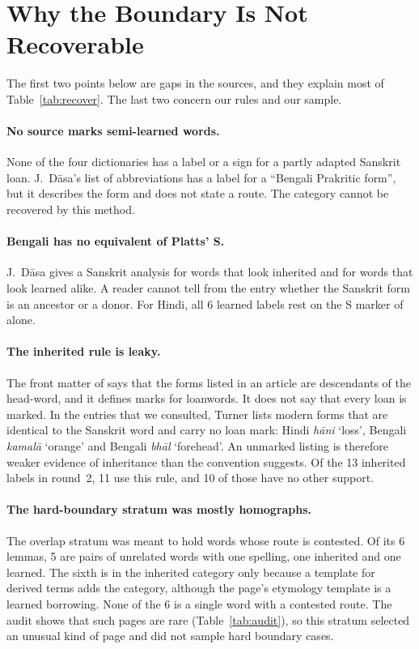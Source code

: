 \documentclass[11pt]{article}
\newcommand{\gl}[1]{`#1'}
\begin{document}
\section{Why the Boundary Is Not Recoverable}
\label{sec:why}

The first two points below are gaps in the sources, and they explain most of Table~\ref{tab:recover}. The last two concern our rules and our sample.

\paragraph{No source marks semi-learned words.} None of the four dictionaries has a label or a sign for a partly adapted Sanskrit loan. J.~D\=asa's list of abbreviations has a label for a ``Bengali Prakritic form'', but it describes the form and does not state a route. The category cannot be recovered by this method.

\paragraph{Bengali has no equivalent of Platts' S.} J.~D\=asa gives a Sanskrit analysis for words that look inherited and for words that look learned alike. A reader cannot tell from the entry whether the Sanskrit form is an ancestor or a donor. For Hindi, all 6 learned labels rest on the S marker of \citet{platts1884} alone.

\paragraph{The inherited rule is leaky.} The front matter of \citet{turner1966cdial} says that the forms listed in an article are descendants of the head-word, and it defines marks for loanwords. It does not say that every loan is marked. In the entries that we consulted, Turner lists modern forms that are identical to the Sanskrit word and carry no loan mark: Hindi \textit{h\=ani} \gl{loss}, Bengali \textit{kamal\=a} \gl{orange} and Bengali \textit{bh\=al} \gl{forehead}. An unmarked listing is therefore weaker evidence of inheritance than the convention suggests. Of the 13 inherited labels in round~2, 11 use this rule, and 10 of those have no other support.

\paragraph{The hard-boundary stratum was mostly homographs.} The overlap stratum was meant to hold words whose route is contested. Of its 6 lemmas, 5 are pairs of unrelated words with one spelling, one inherited and one learned. The sixth is in the inherited category only because a template for derived terms adds the category, although the page's etymology template is a learned borrowing. None of the 6 is a single word with a contested route. The audit shows that such pages are rare (Table~\ref{tab:audit}), so this stratum selected an unusual kind of page and did not sample hard boundary cases.
\end{document}
